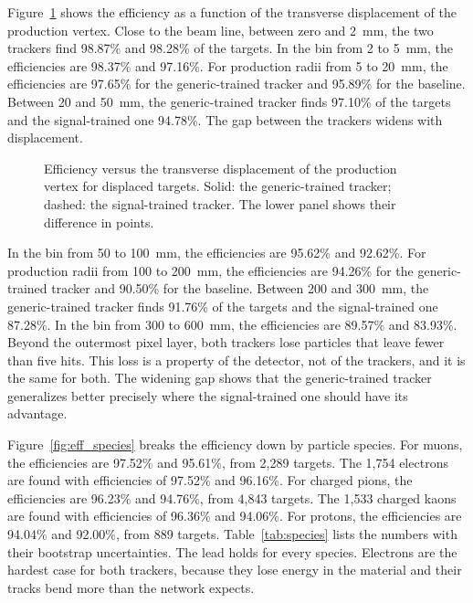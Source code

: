 Figure~\ref{fig:eff_disp} shows the efficiency as a function of the transverse displacement of the
production vertex. Close to the beam line, between zero and 2~mm, the two trackers find 98.87\% and
98.28\% of the targets. In the bin from 2 to 5~mm, the efficiencies are 98.37\% and 97.16\%. For
production radii from 5 to 20~mm, the efficiencies are 97.65\% for the generic-trained tracker and
95.89\% for the baseline. Between 20 and 50~mm, the generic-trained tracker finds 97.10\% of the
targets and the signal-trained one 94.78\%. The gap between the trackers widens with displacement.

\begin{figure}[tbp]
  \centering
  \caption{Efficiency versus the transverse displacement of the production vertex for displaced targets. Solid: the generic-trained tracker; dashed: the signal-trained tracker. The lower panel shows their difference in points.}
  \label{fig:eff_disp}
\end{figure}

In the bin from 50 to 100~mm, the efficiencies are 95.62\% and 92.62\%. For production radii from
100 to 200~mm, the efficiencies are 94.26\% for the generic-trained tracker and 90.50\% for the
baseline. Between 200 and 300~mm, the generic-trained tracker finds 91.76\% of the targets and the
signal-trained one 87.28\%. In the bin from 300 to 600~mm, the efficiencies are 89.57\% and 83.93\%.
Beyond the outermost pixel layer, both trackers lose particles that leave fewer than five hits. This
loss is a property of the detector, not of the trackers, and it is the same for both. The widening
gap shows that the generic-trained tracker generalizes better precisely where the signal-trained one
should have its advantage.

Figure~\ref{fig:eff_species} breaks the efficiency down by particle species. For muons, the
efficiencies are 97.52\% and 95.61\%, from 2,289 targets. The 1,754 electrons are found with
efficiencies of 97.52\% and 96.16\%. For charged pions, the efficiencies are 96.23\% and 94.76\%,
from 4,843 targets. The 1,533 charged kaons are found with efficiencies of 96.36\% and 94.06\%. For
protons, the efficiencies are 94.04\% and 92.00\%, from 889 targets. Table~\ref{tab:species} lists
the numbers with their bootstrap uncertainties. The lead holds for every species. Electrons are the
hardest case for both trackers, because they lose energy in the material and their tracks bend more
than the network expects.

